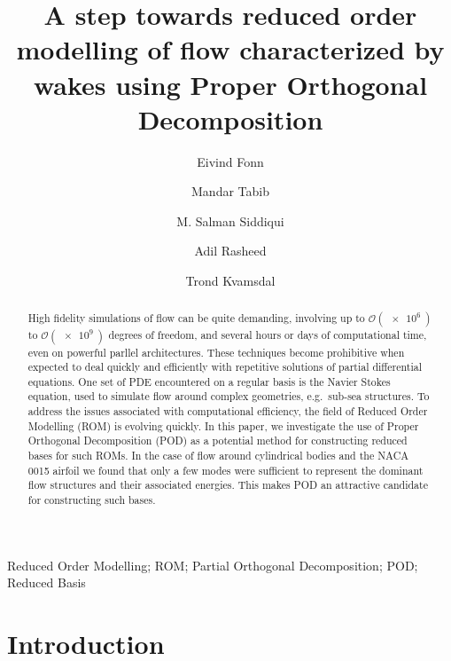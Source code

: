 \documentclass[3p,times,procedia]{elsarticle}
\begin{document}
\begin{frontmatter}


\title{A step towards reduced order modelling of flow characterized by wakes
  using Proper Orthogonal Decomposition}

\author[a]{Eivind Fonn}
\author[a]{Mandar Tabib}
\author[a,b]{M. Salman Siddiqui}
\author[a]{Adil Rasheed}
\author[a,b]{Trond Kvamsdal}

\address[a]{CSE Group, Mathematics and Cybernetics, Sintef Digital, 7034, Trondheim, Norway}
\address[b]{Department of Mathematical Sciences, NTNU, Alfred Getz vei 1, 7491,
  Trondheim, Norway}

\begin{abstract}
  High fidelity simulations of flow can be quite demanding, involving up to
  $\mathcal{O}(\SI{e6}{})$ to $\mathcal{O}(\SI{e9}{})$ degrees of freedom, and
  several hours or days of computational time, even on powerful parllel
  architectures. These techniques become prohibitive when expected to deal
  quickly and efficiently with repetitive solutions of partial differential
  equations. One set of PDE encountered on a regular basis is the Navier Stokes
  equation, used to simulate flow around complex geometries, e.g.~sub-sea
  structures. To address the issues associated with computational efficiency,
  the field of Reduced Order Modelling (ROM) is evolving quickly. In this paper,
  we investigate the use of Proper Orthogonal Decomposition (POD) as a potential
  method for constructing reduced bases for such ROMs. In the case of flow
  around cylindrical bodies and the NACA 0015 airfoil we found that only a few
  modes were sufficient to represent the dominant flow structures and their
  associated energies. This makes POD an attractive candidate for constructing
  such bases.
\end{abstract}

\begin{keyword}
  Reduced Order Modelling; ROM; Partial Orthogonal Decomposition; POD;
  Reduced Basis
\end{keyword}
\end{frontmatter}


\section{Introduction}
\label{main}
\end{document}
